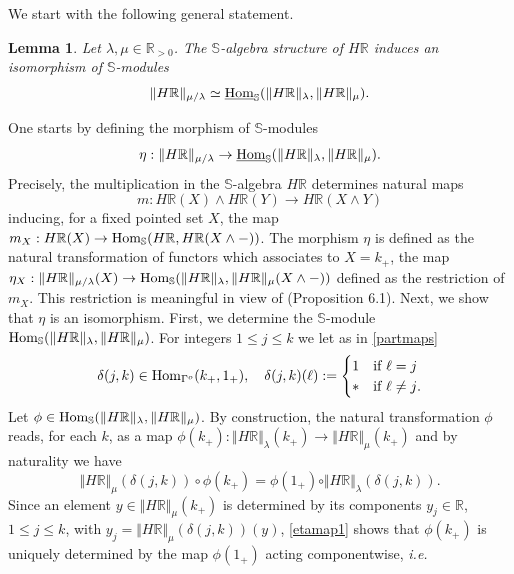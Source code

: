 \documentclass[cupthm]{CUP-JNL-JMJ}
\numberwithin{equation}{section}
\theoremstyle{cupplain}
\newtheorem{lemma}[theorem]{Lemma}
\theoremstyle{cupdefinition}
\theoremstyle{cupremark}
\theoremstyle{cupproof}
\def\R{{\mathbb R}}
\def\S{{\mathbb S}}
\def\sss{{\S}}
\def\Hom {{\rm{Hom}}}
\def\gop{{\Gamma^{o}}}
\def\uhom{{\underline \Hom}}
\newcommand{\ie}{{\it i.e.\/}\ }
\begin{document}
 We start with the following general statement.  
 \begin{lemma}\label{homhom} Let $\lambda, \mu\in\R_{>0}$. The $\sss$-algebra structure of $H\R$ induces an isomorphism of $\sss$-modules
  	\begin{equation}\label{homhom1}
\Vert H\R\Vert_{\mu/\lambda}\simeq \uhom_\sss(\Vert H\R\Vert_\lambda,\Vert H\R\Vert_\mu).
\end{equation}
  \end{lemma}
\proof One starts by defining the morphism of $\sss$-modules 
\begin{equation}\label{etamap}
 	\eta: \Vert H\R\Vert_{\mu/\lambda}\to \uhom_\sss(\Vert H\R\Vert_\lambda,\Vert H\R\Vert_\mu).
 \end{equation}
Precisely, the multiplication in the $\sss$-algebra  $H\R$  determines  natural maps 
\[
m:H\R(X)\wedge H\R(Y)\to H\R(X\wedge Y)
\]
inducing, for a fixed pointed set $X$, the map $m_X: H\R(X)\to \Hom_\sss( H\R,H\R( X\wedge -))$.
The morphism  $\eta$ is defined as the natural transformation of functors which associates to  $X=k_+$, the map  $\eta_X:\Vert H\R\Vert_{\mu/\lambda}(X)\to \Hom_\sss(\Vert H\R\Vert_\lambda,\Vert H\R\Vert_\mu( X\wedge -))$ defined as the restriction of $m_X$. This restriction is meaningful in view of  \cite{CCprel} (Proposition 6.1).\newline
Next, we show that $\eta$ is an isomorphism. First, we determine the $\sss$-module $\Hom_\sss(\Vert H\R\Vert_\lambda,\Vert H\R\Vert_\mu)$. For integers $1\leq j\leq k$ we let as in \eqref{partmaps}
\[
\delta(j,k)\in \Hom_\gop(k_+,1_+), \quad \delta(j,k)(\ell):=\begin{cases} 1 &\text{if $\ell=j$}\\ * &\text{if $\ell\neq j$}.	
\end{cases}
\]
 Let $\phi\in \Hom_\sss(\Vert H\R\Vert_\lambda,\Vert H\R\Vert_\mu)$. By construction, the natural transformation $\phi$ reads, for each $k$, as a map $\phi(k_+):\Vert H\R\Vert_\lambda(k_+)\to \Vert H\R\Vert_\mu(k_+)$ and by naturality we have
 \begin{equation}\label{etamap1}
\Vert H\R\Vert_\mu(\delta(j,k))\circ \phi(k_+)=\phi(1_+)\circ \Vert H\R\Vert_\lambda(\delta(j,k)).
\end{equation}
 Since an element  $y\in\Vert H\R\Vert_\mu(k_+)$ is determined by its components $y_j\in \R$, $1\leq j\leq k$,
with $y_j=\Vert H\R\Vert_\mu(\delta(j,k))(y)$, \eqref{etamap1} shows that  $\phi(k_+)$ is uniquely determined by the map  $\phi(1_+)$ acting componentwise, \ie 
\end{document}
